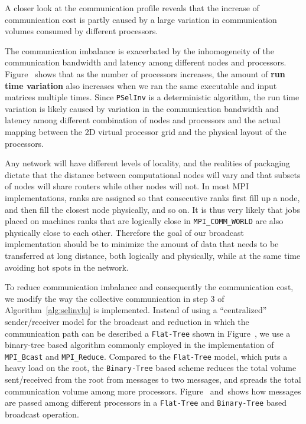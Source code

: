 \documentclass{acm_proc_article-sp}
\newcommand{\pselinv}{\texttt{PSelInv}\xspace}
\newcommand{\flattree}{\texttt{Flat-Tree}\xspace}
\newcommand{\btree}{\texttt{Binary-Tree}\xspace}
\begin{document}
A closer look at the communication profile reveals that
the increase of communication cost is partly caused by 
a large variation in communication volumes consumed by different
processors.



The communication imbalance is exacerbated by the inhomogeneity of
the communication bandwidth and latency among different 
nodes and processors.  Figure~ shows that as the number of
processors increases, the amount of \textbf{run time variation} also 
increases when we ran the same executable and input matrices multiple
times.  Since \pselinv is a deterministic algorithm, the run time
variation is likely caused by variation in the communication bandwidth
and latency among different combination of nodes and processors and the actual 
mapping between the 2D virtual processor grid and the physical
layout of the processors.

Any network will have different levels of locality, and the realities 
of packaging dictate that the distance between computational nodes will vary and that
subsets of nodes will share routers while other nodes will not.
In most MPI implementations, ranks are assigned so that consecutive ranks
first fill up a node, and then fill the closest node physically, and so on.
It is thus very likely that jobs placed on machines ranks that
are logically close in \texttt{MPI\_COMM\_WORLD} are also physically
close to each other.
Therefore the goal of our broadcast implementation should be to minimize
the amount of data that needs to be transferred at long distance, both 
logically and physically, while at the same time avoiding hot spots in
the network. 



To reduce communication imbalance and consequently the communication 
cost, we modify the way the collective communication in 
step 3 of Algorithm~\ref{alg:selinvlu} is implemented. Instead of using
a ``centralized'' sender/receiver model for the broadcast and
reduction in which the communication path can be described a \flattree
shown in Figure~, 
we use a binary-tree based algorithm commonly employed in the 
implementation of \texttt{MPI\_Bcast} and \texttt{MPI\_Reduce}.
Compared to the \flattree model, which puts a heavy load on the 
root, the \btree based scheme reduces the total
volume {sent/received} from the root from  messages to two messages, 
and spreads the total communication volume among more processors.  
Figure~
and~shows 
how messages are passed among different processors in a \flattree and 
\btree based broadcast operation.
\end{document}
